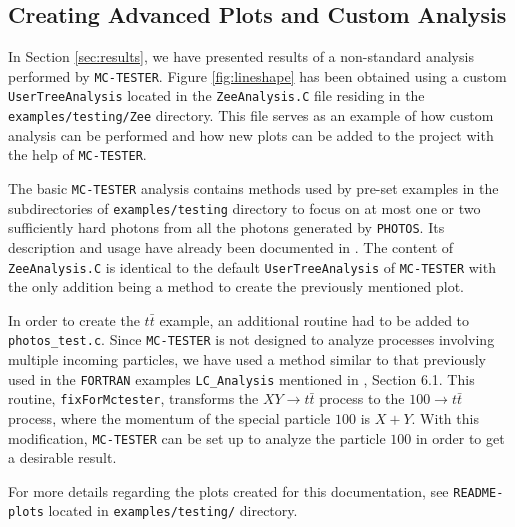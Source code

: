 \documentclass[]{Photos_interface_design}
\begin{document}
\subsection{Creating Advanced Plots and Custom Analysis}
\label{App:Plots}

In Section \ref{sec:results}, we have presented results of a non-standard
analysis performed by {\tt MC-TESTER}. Figure \ref{fig:lineshape} has been
obtained using a custom {\tt UserTreeAnalysis} located in the {\tt ZeeAnalysis.C} file
residing in the {\tt examples/testing/Zee} directory. This file serves as an
example of how custom analysis can be performed and how new plots can be
added to the project with the help of {\tt MC-TESTER}.

The basic {\tt MC-TESTER} analysis contains methods used by pre-set examples
in the subdirectories of {\tt examples/testing} directory to focus on at most one or two 
sufficiently hard photons from all the photons generated
by {\tt PHOTOS}. Its description and usage have already been documented in \cite{Davidson:2008ma}.
The content of {\tt ZeeAnalysis.C} is identical to the default {\tt UserTreeAnalysis}
of {\tt MC-TESTER} with the only addition being a method to create
the previously mentioned plot.

In order to create the $t \bar t$ example, an additional routine had to be added to {\tt photos\_test.c}.
Since {\tt MC-TESTER} is not designed to analyze processes involving
multiple incoming particles, we have used a method similar to that previously
used in the {\tt FORTRAN} examples {\tt LC\_Analysis} mentioned in \cite{Golonka:2002rz}, Section 6.1.
This routine, {\tt fixForMctester}, transforms the $X Y \rightarrow t \bar t$
process to the $100 \rightarrow t \bar t$ process,
where the momentum of the
special particle $100$ is $X + Y$. With this modification, {\tt MC-TESTER} can be set
up to analyze the particle $100$ in order to get a desirable result.

For more details regarding the plots created for this documentation, see
{\tt README-plots} located in {\tt examples/testing/} directory.

\end{document}
